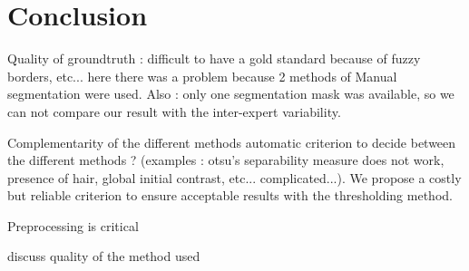 \documentclass[a4paper,10pt]{article}
\begin{document}
\section*{Conclusion}
 Quality of groundtruth : difficult to have a gold standard because of fuzzy borders, etc... here there was a problem because 2 methods of Manual segmentation were used. Also : only one segmentation mask was available, so we can not compare our result with the inter-expert variability.

 Complementarity of the different methods
 automatic criterion to decide between the different methods ? (examples : otsu's separability measure does not work, presence of hair, global initial contrast, etc... complicated...). We propose a costly but reliable criterion to ensure acceptable results with the thresholding method.
 
 Preprocessing is critical
 
discuss quality of the method used







\end{document}
